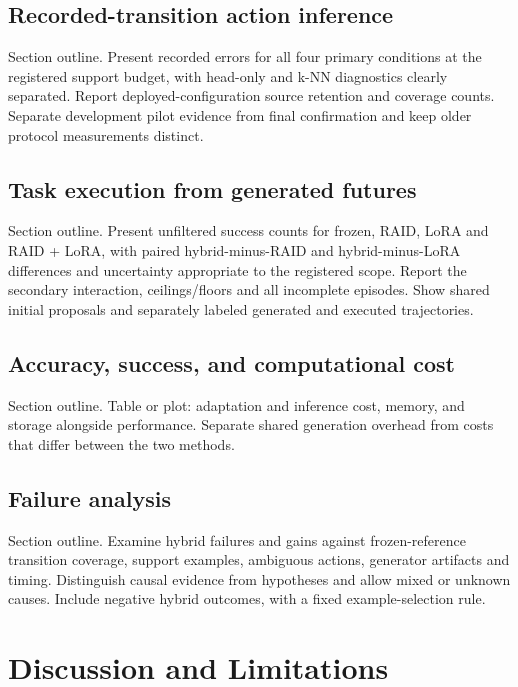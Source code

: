 \documentclass[11pt,a4paper]{article}
\begin{document}
\subsection{Recorded-transition action inference}

Section outline. Present recorded errors for all four primary conditions at the registered support budget, with head-only and k-NN diagnostics clearly separated. Report deployed-configuration source retention and coverage counts. Separate development pilot evidence from final confirmation and keep older protocol measurements distinct.

\subsection{Task execution from generated futures}

Section outline. Present unfiltered success counts for frozen, RAID, LoRA and RAID + LoRA, with paired hybrid-minus-RAID and hybrid-minus-LoRA differences and uncertainty appropriate to the registered scope. Report the secondary interaction, ceilings/floors and all incomplete episodes. Show shared initial proposals and separately labeled generated and executed trajectories.

\subsection{Accuracy, success, and computational cost}

Section outline. Table or plot: adaptation and inference cost, memory, and storage alongside performance. Separate shared generation overhead from costs that differ between the two methods.

\subsection{Failure analysis}

Section outline. Examine hybrid failures and gains against frozen-reference transition coverage, support examples, ambiguous actions, generator artifacts and timing. Distinguish causal evidence from hypotheses and allow mixed or unknown causes. Include negative hybrid outcomes, with a fixed example-selection rule.

\section{Discussion and Limitations}
\end{document}
